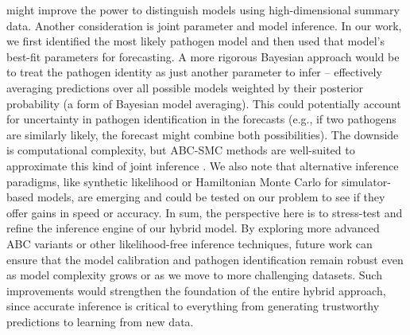 \cite{jagalur2021abc} might improve the power to distinguish models using high-dimensional summary data. Another consideration is joint parameter and model inference. In our work, we first identified the most likely pathogen model and then used that model’s best-fit parameters for forecasting. A more rigorous Bayesian approach would be to treat the pathogen identity as just another parameter to infer – effectively averaging predictions over all possible models weighted by their posterior probability (a form of Bayesian model averaging). This could potentially account for uncertainty in pathogen identification in the forecasts (e.g., if two pathogens are similarly likely, the forecast might combine both possibilities). The downside is computational complexity, but ABC-SMC methods are well-suited to approximate this kind of joint inference \cite{beaumont2019abc}. We also note that alternative inference paradigms, like synthetic likelihood or Hamiltonian Monte Carlo for simulator-based models, are emerging and could be tested on our problem to see if they offer gains in speed or accuracy. In sum, the perspective here is to stress-test and refine the inference engine of our hybrid model. By exploring more advanced ABC variants or other likelihood-free inference techniques, future work can ensure that the model calibration and pathogen identification remain robust even as model complexity grows or as we move to more challenging datasets. Such improvements would strengthen the foundation of the entire hybrid approach, since accurate inference is critical to everything from generating trustworthy predictions to learning from new data.

